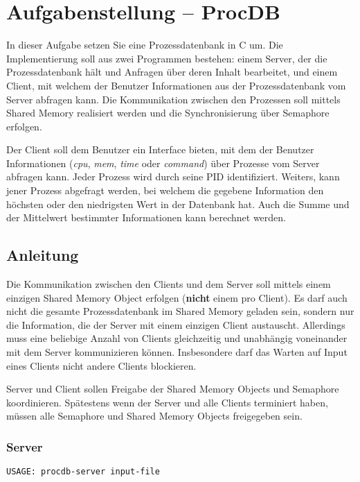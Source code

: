 



\section*{Aufgabenstellung -- ProcDB}

In dieser Aufgabe setzen Sie eine Prozessdatenbank in C um. Die Implementierung
soll aus zwei Programmen bestehen: einem Server, der die Prozessdatenbank hält
und Anfragen über deren Inhalt bearbeitet, und einem Client, mit welchem der
Benutzer Informationen aus der Prozessdatenbank vom Server abfragen kann. Die
Kommunikation zwischen den Prozessen soll mittels Shared Memory realisiert
werden und die Synchronisierung über Semaphore erfolgen.

Der Client soll dem Benutzer ein Interface bieten, mit dem der Benutzer
Informationen (\emph{cpu}, \emph{mem}, \emph{time} oder \emph{command}) über
Prozesse vom Server abfragen kann. Jeder Prozess wird durch seine PID
identifiziert. Weiters, kann jener Prozess abgefragt werden, bei welchem die
gegebene Information den höchsten oder den niedrigsten Wert in der Datenbank
hat. Auch die Summe und der Mittelwert bestimmter Informationen kann berechnet
werden.

\subsection*{Anleitung}

Die Kommunikation zwischen den Clients und dem Server soll mittels einem
einzigen Shared Memory Object erfolgen (\textbf{nicht} einem pro Client).  Es
darf auch nicht die gesamte Prozessdatenbank im Shared Memory geladen sein,
sondern nur die Information, die der Server mit einem einzigen Client
austauscht.  Allerdings muss eine beliebige Anzahl von Clients gleichzeitig und
unabhängig voneinander mit dem Server kommunizieren können. Insbesondere darf
das Warten auf Input eines Clients nicht andere Clients blockieren.

Server und Client sollen Freigabe der Shared Memory Objects und Semaphore
koordinieren. Spätestens wenn der Server und alle Clients terminiert haben,
müssen alle Semaphore und Shared Memory Objects freigegeben sein.

\subsubsection*{Server}
\begin{verbatim}
USAGE: procdb-server input-file
\end{verbatim}

